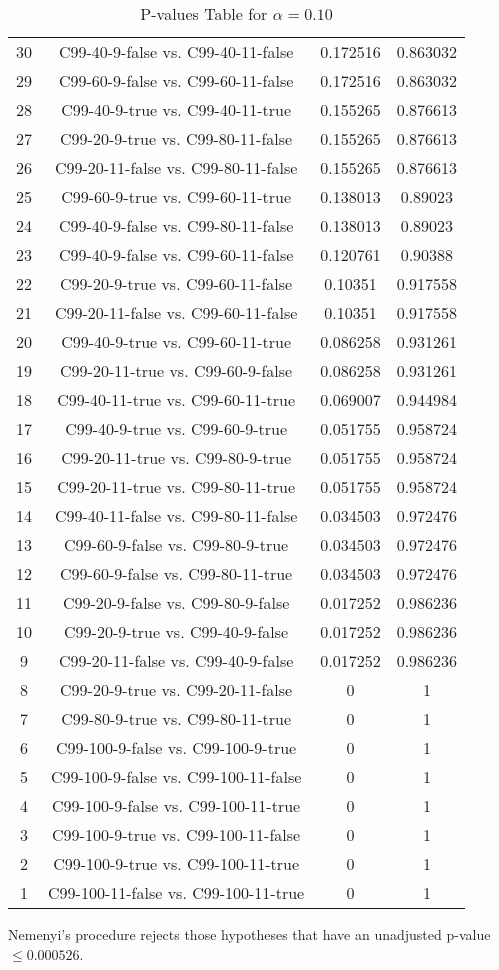\documentclass[a4paper,10pt]{article}
\begin{document}
\begin{landscape}
\begin{table}[!htp]
\begin{tabular}{cccc}
30&C99-40-9-false vs. C99-40-11-false&0.172516&0.863032\\
29&C99-60-9-false vs. C99-60-11-false&0.172516&0.863032\\
28&C99-40-9-true vs. C99-40-11-true&0.155265&0.876613\\
27&C99-20-9-true vs. C99-80-11-false&0.155265&0.876613\\
26&C99-20-11-false vs. C99-80-11-false&0.155265&0.876613\\
25&C99-60-9-true vs. C99-60-11-true&0.138013&0.89023\\
24&C99-40-9-false vs. C99-80-11-false&0.138013&0.89023\\
23&C99-40-9-false vs. C99-60-11-false&0.120761&0.90388\\
22&C99-20-9-true vs. C99-60-11-false&0.10351&0.917558\\
21&C99-20-11-false vs. C99-60-11-false&0.10351&0.917558\\
20&C99-40-9-true vs. C99-60-11-true&0.086258&0.931261\\
19&C99-20-11-true vs. C99-60-9-false&0.086258&0.931261\\
18&C99-40-11-true vs. C99-60-11-true&0.069007&0.944984\\
17&C99-40-9-true vs. C99-60-9-true&0.051755&0.958724\\
16&C99-20-11-true vs. C99-80-9-true&0.051755&0.958724\\
15&C99-20-11-true vs. C99-80-11-true&0.051755&0.958724\\
14&C99-40-11-false vs. C99-80-11-false&0.034503&0.972476\\
13&C99-60-9-false vs. C99-80-9-true&0.034503&0.972476\\
12&C99-60-9-false vs. C99-80-11-true&0.034503&0.972476\\
11&C99-20-9-false vs. C99-80-9-false&0.017252&0.986236\\
10&C99-20-9-true vs. C99-40-9-false&0.017252&0.986236\\
9&C99-20-11-false vs. C99-40-9-false&0.017252&0.986236\\
8&C99-20-9-true vs. C99-20-11-false&0&1\\
7&C99-80-9-true vs. C99-80-11-true&0&1\\
6&C99-100-9-false vs. C99-100-9-true&0&1\\
5&C99-100-9-false vs. C99-100-11-false&0&1\\
4&C99-100-9-false vs. C99-100-11-true&0&1\\
3&C99-100-9-true vs. C99-100-11-false&0&1\\
2&C99-100-9-true vs. C99-100-11-true&0&1\\
1&C99-100-11-false vs. C99-100-11-true&0&1\\
\hline
\end{tabular}
\caption{P-values Table for $\alpha=0.10$}
\end{table}Nemenyi's procedure rejects those hypotheses that have an unadjusted p-value $\le0.000526$.


\end{landscape}
\end{document}
